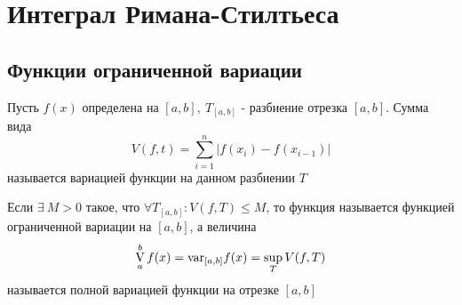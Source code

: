 \newpage
\section{Интеграл Римана-Стилтьеса}
\subsection{Функции ограниченной вариации}
\begin{definition}
    Пусть $f(x)$ определена на $[a,b],\ T_{[a,b]}$ - разбиение отрезка $[a,b]$. Сумма вида 
    \[V(f,t)=\sum\limits_{i=1}^{n}|f(x_i)-f(x_{i-1})|\]
    называется вариацией функции на данном разбиении $T$
\end{definition} 
\begin{definition}
    Если $\exists\ M>0$ такое, что $\forall T_{[a,b]}: V(f,T)\leq M$, то функция называется функцией ограниченной вариации на $[a,b]$, а величина
    \[\operatorname*{V}\limits_{a}^{b} f(x)=\text{var}_{[a,b]}f(x)=\sup\limits_{T}V(f,T)\] %
    называется полной вариацией функции на отрезке $[a,b]$
\end{definition} 
